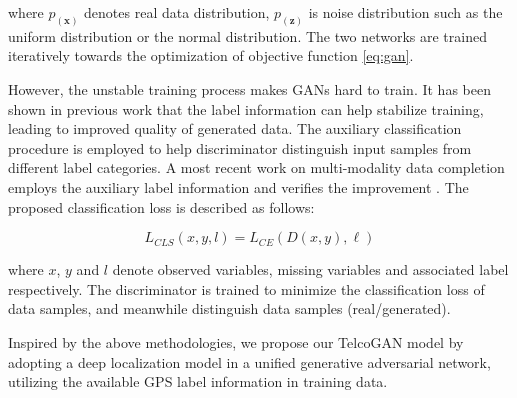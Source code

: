 where $p_(\textbf{x})$ denotes real data distribution, $p_(\textbf{z})$ is noise distribution such as the uniform distribution or the normal distribution. The two networks are trained iteratively towards the optimization of objective function \ref{eq:gan}.

However, the unstable training process makes GANs hard to train. It has been shown in previous work \cite{DBLP:conf/icml/OdenaOS17} that the label information can help stabilize training, leading to improved quality of generated data. The auxiliary classification procedure is employed to help discriminator distinguish input samples from different label categories. A most recent work on multi-modality data completion employs the auxiliary label information and verifies the improvement \cite{DBLP:conf/kdd/CaiWGSJ18}. The proposed classification loss is described as follows:

\begin{equation}\label{eq:multi}
  L_{CLS}(x, y, l)=L_{CE}(D(x,y),\ell)
\end{equation}

where $x$, $y$ and $l$ denote observed variables, missing variables and associated label respectively. The discriminator is trained to minimize the classification loss of data samples, and meanwhile distinguish data samples (real/generated).

Inspired by the above methodologies, we propose our TelcoGAN model by adopting a deep localization model in a unified generative adversarial network, utilizing the available GPS label information in training data.
